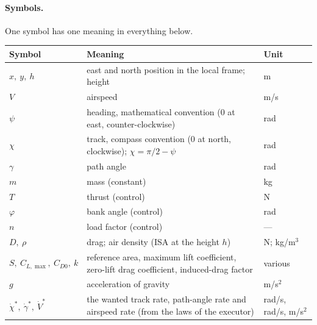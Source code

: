 
\paragraph{Symbols.} One symbol has one meaning in everything below.

\begin{table}[h]
\centering
\small
\renewcommand{\arraystretch}{1.15}
\begin{tabular}{@{}l l l@{}}
\toprule
Symbol & Meaning & Unit \\
\midrule
$x,\ y,\ h$ & east and north position in the local frame; height & m \\
$V$ & airspeed & m/s \\
$\psi$ & heading, mathematical convention (0 at east, counter-clockwise) & rad \\
$\chi$ & track, compass convention (0 at north, clockwise); $\chi = \pi/2 - \psi$ & rad \\
$\gamma$ & path angle & rad \\
$m$ & mass (constant) & kg \\
\midrule
$T$ & thrust (control) & N \\
$\varphi$ & bank angle (control) & rad \\
$n$ & load factor (control) & --- \\
\midrule
$D,\ \rho$ & drag; air density (ISA at the height $h$) & N; kg/m$^3$ \\
$S,\ C_{L,\max},\ C_{D0},\ k$ & reference area, maximum lift coefficient, zero-lift drag coefficient, induced-drag factor & various \\
$g$ & acceleration of gravity & m/s$^2$ \\
$\dot{\chi}^{*},\ \dot{\gamma}^{*},\ \dot{V}^{*}$ & the wanted track rate, path-angle rate and airspeed rate (from the laws of the executor) & rad/s, rad/s, m/s$^2$ \\
\bottomrule
\end{tabular}
\end{table}

